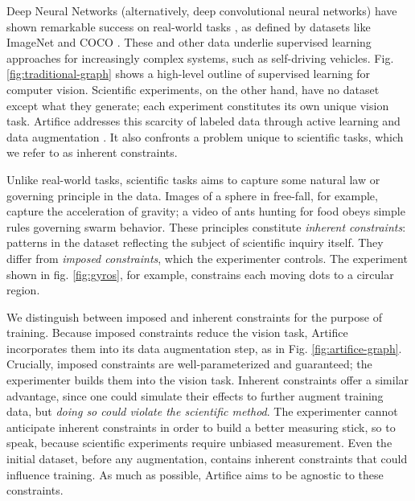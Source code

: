 \documentclass[10pt, journal]{IEEEtran}
\begin{document}
Deep Neural Networks (alternatively, deep convolutional neural networks) have
shown remarkable success on real-world tasks \cite{krizhevsky_imagenet_2012}, as
defined by datasets like ImageNet \cite{deng_imagenet:_nodate} and COCO
\cite{lin_microsoft_2014}. These and other data underlie supervised learning
approaches for increasingly complex systems, such as self-driving
vehicles. Fig. \ref{fig:traditional-graph} shows a high-level outline of
supervised learning for computer vision. Scientific experiments, on the other
hand, have no dataset except what they generate; each experiment constitutes its
own unique vision task. Artifice addresses this scarcity of labeled data through
active learning \cite{settles_active_2012, kao_localization-aware_2018,
  jain_active_2016} and data augmentation \cite{krizhevsky_imagenet_2012,
  ronneberger_u-net:_2015}. It also confronts a problem unique to scientific
tasks, which we refer to as inherent constraints.

Unlike real-world tasks, scientific tasks aims to capture some natural law or
governing principle in the data. Images of a sphere in free-fall, for example,
capture the acceleration of gravity; a video of ants hunting for food obeys
simple rules governing swarm behavior. These principles constitute
\emph{inherent constraints}: patterns in the dataset reflecting the subject of
scientific inquiry itself. They differ from \emph{imposed constraints}, which
the experimenter controls. The experiment shown in fig. \ref{fig:gyros}, for
example, constrains each moving dots to a circular region.

We distinguish between imposed and inherent constraints for the purpose of
training. Because imposed constraints reduce the vision task, Artifice
incorporates them into its data augmentation step, as in
Fig. \ref{fig:artifice-graph}. Crucially, imposed constraints are
well-parameterized and guaranteed; the experimenter builds them into the vision
task. Inherent constraints offer a similar advantage, since one could simulate
their effects to further augment training data, but \emph{doing so could violate
  the scientific method}. The experimenter cannot anticipate inherent
constraints in order to build a better measuring stick, so to speak, because
scientific experiments require unbiased measurement. Even the initial dataset,
before any augmentation, contains inherent constraints that could influence
training. As much as possible, Artifice aims to be agnostic to these constraints.
\end{document}
